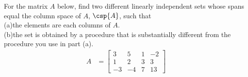 For the matrix $A$ below, find two different linearly independent sets whose spans equal the column space of $A$, $\csp{A}$, such that\\
(a)\quad the elements are each columns of $A$.\\
(b)\quad the set is obtained by a procedure that is substantially different from the procedure you use in part (a).
%
\begin{align*}
A&=
\begin{bmatrix}
 3 & 5 & 1 & -2 \\
 1 & 2 & 3 & 3 \\
 -3 & -4 & 7 & 13
\end{bmatrix}
\end{align*}
%
